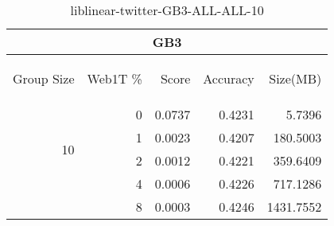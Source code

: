 \begin{center}
\begin{table}[htbp] 
 \begin{center}
\begin{tabular}{ | r | r | r | r | r |}
\hline
\multicolumn{5}{|c|}{GB3}\\
\hline
\begin{sideways}Group Size\end{sideways} & \begin{sideways}Web1T \%\end{sideways} & \begin{sideways}Score\end{sideways} & \begin{sideways}Accuracy\end{sideways} & \begin{sideways}Size(MB)\end{sideways}\\
\hline
\multirow{4}{*}{10}
 & 0 & 0.0737 & 0.4231 & 5.7396\\ \cline{2-5}
 & 1 & 0.0023 & 0.4207 & 180.5003\\ \cline{2-5}
 & 2 & 0.0012 & 0.4221 & 359.6409\\ \cline{2-5}
 & 4 & 0.0006 & 0.4226 & 717.1286\\ \cline{2-5}
 & 8 & 0.0003 & 0.4246 & 1431.7552\\ \cline{2-5}
\hline
\end{tabular}
\caption{liblinear-twitter-GB3-ALL-ALL-10}
\label{table:liblinear-twitter-GB3-ALL-ALL-10}
\end{center}
 \end{table}
\end{center}

